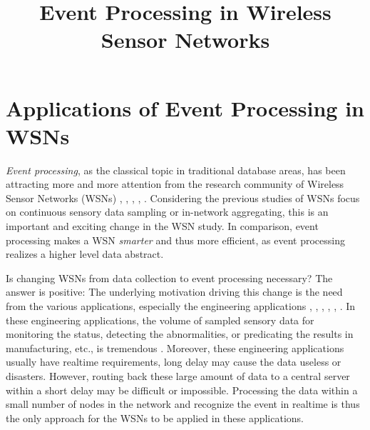 \documentclass[12pt,journal,draftcls,letterpaper,onecolumn]{elsarticle}
\begin{document}
%
\title{Event Processing in Wireless Sensor Networks}

\maketitle



%





\section{Applications of Event Processing in WSNs}

\emph{Event processing}, as the classical topic in traditional
database areas, has been attracting more and more attention from the
research community of Wireless Sensor Networks (WSNs) \cite{332838},
\cite{345920}, \cite{Li03eventdetection},
\cite{DBLP:conf/vldb/AbadiML05}, \cite{dsware}. Considering the
previous studies of WSNs focus on continuous sensory data sampling
or in-network aggregating, this is an important and exciting change
in the WSN study. In comparison, event processing makes a WSN
\emph{smarter} and thus more efficient, as event processing realizes
a higher level data abstract.

Is changing WSNs from data collection to event processing necessary?
The answer is positive: The underlying motivation driving this
change is the need from the various applications, especially the
engineering applications \cite{990704}, \cite{sawant2004uba},
\cite{chen2006wws}, \cite{taniros04},
\cite{DBLP:journals/ijsnet/WangCLCXL09}, \cite{Low-Power05}. In
these engineering applications, the volume of sampled sensory data
for monitoring the status, detecting the abnormalities, or
predicating the results in manufacturing, etc., is tremendous
\cite{Li02detection}. Moreover, these engineering applications
usually have realtime requirements, long delay may cause the data
useless or disasters. However, routing back these large amount of
data to a central server within a short delay may be difficult or
impossible. Processing the data within a small number of nodes in
the network and recognize the event in realtime is thus the only
approach for the WSNs to be applied in these applications.
\end{document}
